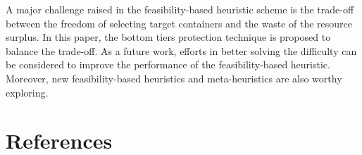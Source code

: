 \documentclass[review,3p,times,12pt,number]{elsarticle}\usepackage{amsmath}\usepackage{amssymb}
\begin{document}
A major challenge raised in the feasibility-based heuristic scheme is the trade-off between the freedom of selecting target containers and the waste of the resource surplus. In this paper, the bottom tiers protection technique is proposed to balance the trade-off. As a future work, efforts in better solving the difficulty can be considered to improve the performance of the feasibility-based heuristic. Moreover, new feasibility-based heuristics and meta-heuristics are also worthy exploring. 


\section*{References}

%


\end{document}
